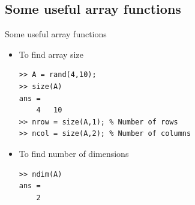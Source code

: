 \documentclass{beamer}
\begin{document}
\subsection{Some useful array functions}
\begin{frame}[fragile]{Some useful array functions}
	\begin{itemize}
		\item To find array size
		
		\begin{lstlisting}[style=Matlab-editor]
>> A = rand(4,10);
>> size(A)
ans = 
	4	10
>> nrow = size(A,1); % Number of rows
>> ncol = size(A,2); % Number of columns
		\end{lstlisting}
		\item To find number of dimensions
		
		\begin{lstlisting}[style=Matlab-editor]
>> ndim(A)
ans = 
	2
		\end{lstlisting}
	\end{itemize}
\end{frame}
\end{document}
